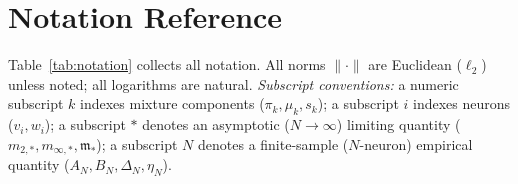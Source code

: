 \documentclass[11pt]{article}
\begin{document}
\clearpage
\appendix

\section{Notation Reference}\label{app:notation}

Table~\ref{tab:notation} collects all notation.
All norms $\|\cdot\|$ are Euclidean ($\ell_2$) unless noted;
all logarithms are natural.
\emph{Subscript conventions:}
a numeric subscript $k$ indexes mixture components ($\pi_k, \mu_k, s_k$);
a subscript $i$ indexes neurons ($v_i, w_i$);
a subscript $*$ denotes an asymptotic ($N\!\to\!\infty$) limiting quantity
($m_{2,*}, m_{\infty,*}, \mathfrak{m}_*$);
a subscript $N$ denotes a finite-sample ($N$-neuron) empirical quantity
($A_N, B_N, \Delta_N, \eta_N$).
\end{document}
